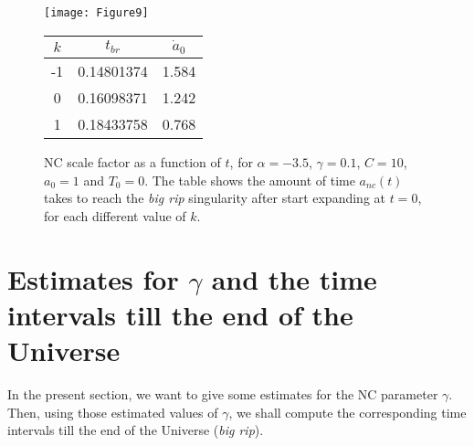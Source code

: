 \documentclass[12pt]{article}
\newcommand{\0}{{(0)}}
\newcommand{\1}{{(1)}}
\newcommand{\2}{{(2)}}
\begin{document}
{\begin{figure}[!htb]
	\centering
	\begin{minipage}[c]{0.49\linewidth}
		\centering
		\texttt{[image: Figure9]}
	\end{minipage}
	\hfill
	\begin{minipage}[c]{0.49\linewidth}
		\centering
		\begin{tabular}{ccc}\hline
			$k$ & $t_{br}$ & $\dot{a}_0$ \\ \hline
			-1 & 0.14801374 & 1.584\\
			0 & 0.16098371 & 1.242 \\
			1 & 0.18433758 & 0.768 \\ \hline
		\end{tabular}
	\end{minipage}
	\caption{\footnotesize NC scale factor as a function of $t$, for $\alpha = -3.5$, $\gamma = 0.1$, $C = 10$, 
	$a_0 = 1$ and $T_0 = 0$.
	The table shows the amount of time $a_{nc}(t)$ takes to reach the {\it big rip} singularity after start expanding at $t=0$, 
		for each different value of $k$.}\label{fig9}
\end{figure}

\section{Estimates for $\gamma$ and the time intervals till the end of the Universe}
\label{sec:endofuniverse}

In the present section, we want to give some estimates for the NC parameter $\gamma$. 
Then, using those estimated values of $\gamma$, we shall compute the corresponding time intervals till the end 
of the Universe ({\it big rip}). 

}
\end{document}
